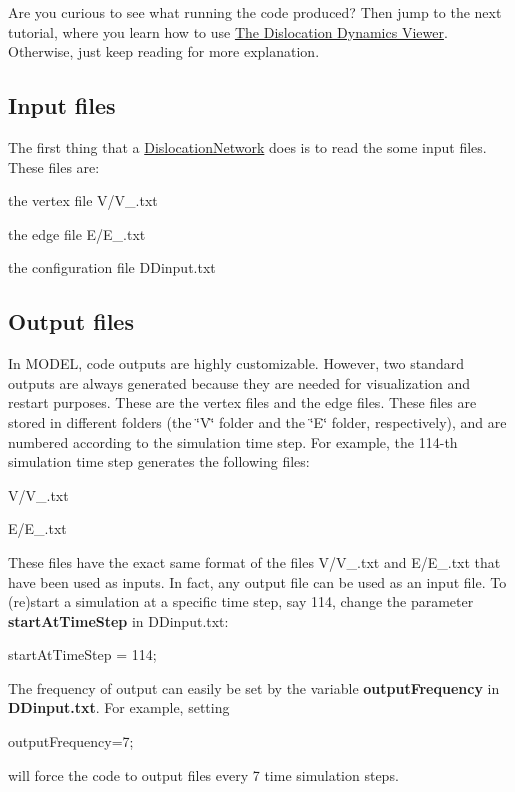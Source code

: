 Are you curious to see what running the code produced? Then jump to the next tutorial, where you learn how to use \hyperlink{DD_visualization}{The Dislocation Dynamics Viewer}. Otherwise, just keep reading for more explanation.\hypertarget{_f_rsource_FRsource_input}{}\subsection{Input files}\label{_f_rsource_FRsource_input}
The first thing that a \hyperlink{classmodel_1_1_dislocation_network}{Dislocation\+Network} does is to read the some input files. These files are\+:
\begin{DoxyItemize}
\item the vertex file V/\+V\+\_.\+txt
\item the edge file E/\+E\+\_.\+txt
\item the configuration file D\+Dinput.\+txt
\end{DoxyItemize}\hypertarget{_f_rsource_FRsource_output}{}\subsection{Output files}\label{_f_rsource_FRsource_output}
In M\+O\+D\+E\+L, code outputs are highly customizable. However, two standard outputs are always generated because they are needed for visualization and restart purposes. These are the vertex files and the edge files. These files are stored in different folders (the \char`\"{}\+V\char`\"{} folder and the \char`\"{}\+E\char`\"{} folder, respectively), and are numbered according to the simulation time step. For example, the 114-\/th simulation time step generates the following files\+:
\begin{DoxyItemize}
\item V/\+V\+\_.\+txt
\item E/\+E\+\_.\+txt
\end{DoxyItemize}

These files have the exact same format of the files V/\+V\+\_.\+txt and E/\+E\+\_.\+txt that have been used as inputs. In fact, any output file can be used as an input file. To (re)start a simulation at a specific time step, say 114, change the parameter {\bfseries start\+At\+Time\+Step} in D\+Dinput.\+txt\+: \begin{DoxyVerb}startAtTimeStep = 114;
\end{DoxyVerb}


The frequency of output can easily be set by the variable {\bfseries output\+Frequency} in {\bfseries D\+Dinput.\+txt}. For example, setting \begin{DoxyVerb}outputFrequency=7;
\end{DoxyVerb}
 will force the code to output files every 7 time simulation steps.

